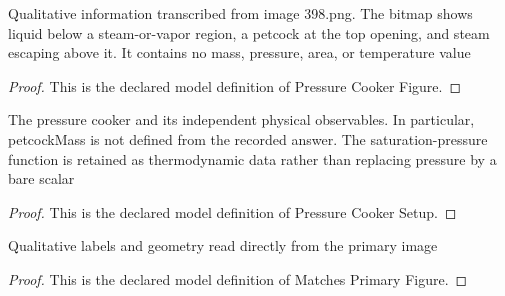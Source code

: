 \begin{definition}
  \label{def:physics:phyx-mini-0398:phyxminiproblems-problemphyxmini0398-pressurecookerfigure}
  Qualitative information transcribed from image 398.png. The bitmap shows liquid below a steam-or-vapor region, a petcock at the top opening, and steam escaping above it. It contains no mass, pressure, area, or temperature value
\end{definition}
\begin{proof}
  This is the declared model definition of Pressure Cooker Figure.
\end{proof}
\begin{definition}
  \label{def:physics:phyx-mini-0398:phyxminiproblems-problemphyxmini0398-pressurecookersetup}
  The pressure cooker and its independent physical observables. In particular, petcockMass is not defined from the recorded answer. The saturation-pressure function is retained as thermodynamic data rather than replacing pressure by a bare scalar
\end{definition}
\begin{proof}
  This is the declared model definition of Pressure Cooker Setup.
\end{proof}
\begin{definition}
  \label{def:physics:phyx-mini-0398:phyxminiproblems-problemphyxmini0398-matchesprimaryfigure}
  Qualitative labels and geometry read directly from the primary image
\end{definition}
\begin{proof}
  This is the declared model definition of Matches Primary Figure.
\end{proof}
